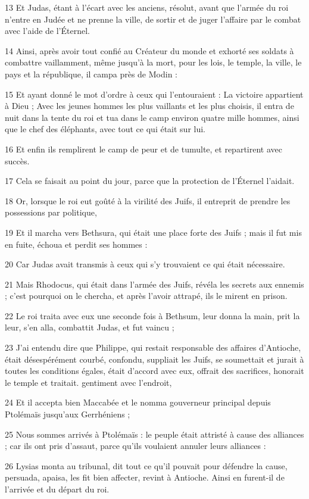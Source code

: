 \par 13 Et Judas, étant à l'écart avec les anciens, résolut, avant que l'armée du roi n'entre en Judée et ne prenne la ville, de sortir et de juger l'affaire par le combat avec l'aide de l'Éternel.
\par 14 Ainsi, après avoir tout confié au Créateur du monde et exhorté ses soldats à combattre vaillamment, même jusqu'à la mort, pour les lois, le temple, la ville, le pays et la république, il campa près de Modin :
\par 15 Et ayant donné le mot d'ordre à ceux qui l'entouraient : La victoire appartient à Dieu ; Avec les jeunes hommes les plus vaillants et les plus choisis, il entra de nuit dans la tente du roi et tua dans le camp environ quatre mille hommes, ainsi que le chef des éléphants, avec tout ce qui était sur lui.
\par 16 Et enfin ils remplirent le camp de peur et de tumulte, et repartirent avec succès.
\par 17 Cela se faisait au point du jour, parce que la protection de l'Éternel l'aidait.
\par 18 Or, lorsque le roi eut goûté à la virilité des Juifs, il entreprit de prendre les possessions par politique,
\par 19 Et il marcha vers Bethsura, qui était une place forte des Juifs ; mais il fut mis en fuite, échoua et perdit ses hommes :
\par 20 Car Judas avait transmis à ceux qui s'y trouvaient ce qui était nécessaire.
\par 21 Mais Rhodocus, qui était dans l'armée des Juifs, révéla les secrets aux ennemis ; c'est pourquoi on le chercha, et après l'avoir attrapé, ils le mirent en prison.
\par 22 Le roi traita avec eux une seconde fois à Bethsum, leur donna la main, prit la leur, s'en alla, combattit Judas, et fut vaincu ;
\par 23 J'ai entendu dire que Philippe, qui restait responsable des affaires d'Antioche, était désespérément courbé, confondu, suppliait les Juifs, se soumettait et jurait à toutes les conditions égales, était d'accord avec eux, offrait des sacrifices, honorait le temple et traitait. gentiment avec l'endroit,
\par 24 Et il accepta bien Maccabée et le nomma gouverneur principal depuis Ptolémaïs jusqu'aux Gerrhéniens ;
\par 25 Nous sommes arrivés à Ptolémaïs : le peuple était attristé à cause des alliances ; car ils ont pris d'assaut, parce qu'ils voulaient annuler leurs alliances :
\par 26 Lysias monta au tribunal, dit tout ce qu'il pouvait pour défendre la cause, persuada, apaisa, les fit bien affecter, revint à Antioche. Ainsi en furent-il de l'arrivée et du départ du roi.

